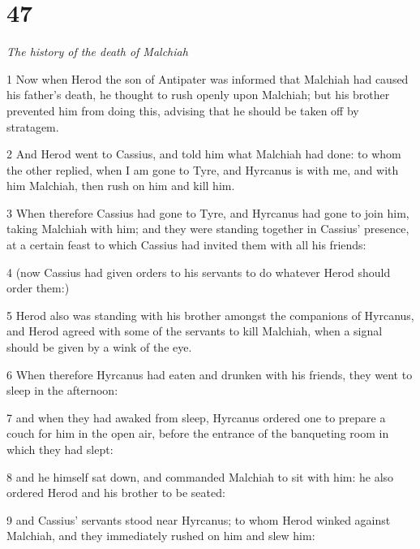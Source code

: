 \chapter{47}

\par \textit{The history of the death of Malchiah}

\par 1 Now when Herod the son of Antipater was informed that Malchiah had caused his father’s death, he thought to rush openly upon Malchiah; but his brother prevented him from doing this, advising that he should be taken off by stratagem. 

\par 2 And Herod went to Cassius, and told him what Malchiah had done: to whom the other replied, when I am gone to Tyre, and Hyrcanus is with me, and with him Malchiah, then rush on him and kill him. 

\par 3 When therefore Cassius had gone to Tyre, and Hyrcanus had gone to join him, taking Malchiah with him; and they were standing together in Cassius’ presence, at a certain feast to which Cassius had invited them with all his friends: 

\par 4 (now Cassius had given orders to his servants to do whatever Herod should order them:) 

\par 5 Herod also was standing with his brother amongst the companions of Hyrcanus, and Herod agreed with some of the servants to kill Malchiah, when a signal should be given by a wink of the eye. 

\par 6 When therefore Hyrcanus had eaten and drunken with his friends, they went to sleep in the afternoon: 

\par 7 and when they had awaked from sleep, Hyrcanus ordered one to prepare a couch for him in the open air, before the entrance of the banqueting room in which they had slept: 

\par 8 and he himself sat down, and commanded Malchiah to sit with him: he also ordered Herod and his brother to be seated: 

\par 9 and Cassius’ servants stood near Hyrcanus; to whom Herod winked against Malchiah, and they immediately rushed on him and slew him: 

